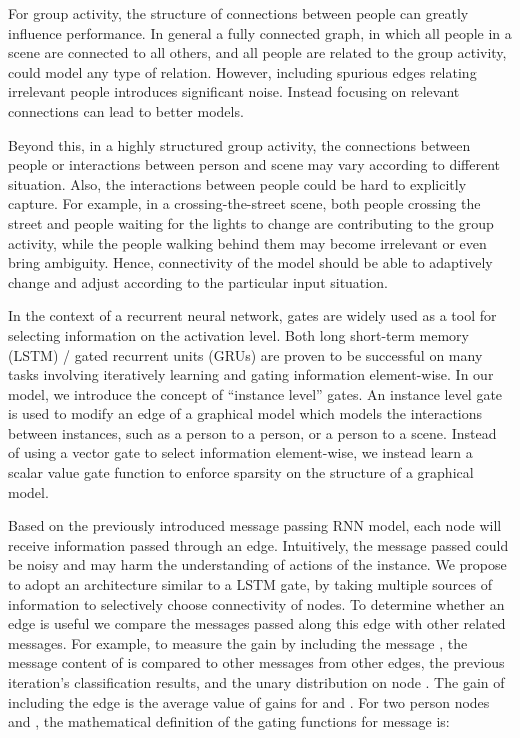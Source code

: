 \documentclass[10pt,twocolumn,letterpaper]{article}
\begin{document}
For group activity, the structure of connections between people can greatly influence performance.  In general a fully connected graph, in which all people in a scene are connected to all others, and all people are related to the group activity, could model any type of relation.  However, including spurious edges relating irrelevant people introduces significant noise.  Instead focusing on relevant connections can lead to better models.

Beyond this, in a highly structured group activity, the connections between people or interactions between person and scene may vary according to different situation. Also, the interactions between people could be hard to explicitly capture. For example, in a crossing-the-street scene, both people crossing the street and people waiting for the lights to change are contributing to the group activity, while the people walking behind them may become irrelevant or even bring ambiguity. Hence, connectivity of the model should be able to adaptively change and adjust according to the particular input situation.

In the context of a recurrent neural network, gates are widely used as a tool for selecting information on the activation level. Both long short-term memory (LSTM) / gated recurrent units (GRUs) are proven to be successful on many tasks involving iteratively learning and gating information element-wise. In our model, we introduce the concept of ``instance level'' gates. An instance level gate is used to modify an edge of a graphical model which models the interactions between instances, such as a person to a person, or a person to a scene. Instead of using a vector gate to select information element-wise, we instead learn a scalar value gate function to enforce sparsity on the structure of a graphical model. 

Based on the previously introduced message passing RNN model, each node will receive information passed through an edge. Intuitively, the message passed could be noisy and may harm the understanding of actions of the instance. We propose to adopt an architecture similar to a LSTM gate, by taking multiple sources of information to selectively choose connectivity of nodes. To determine whether an edge is useful we compare the messages passed along this edge with other related messages. For example, to measure the gain by including the message , the message content of  is compared to other messages from other edges, the previous iteration's classification results, and the unary distribution on node . The gain of including the edge  is the average value of gains for  and .  For two person nodes  and , the mathematical definition of the gating functions for message  is:
\end{document}
